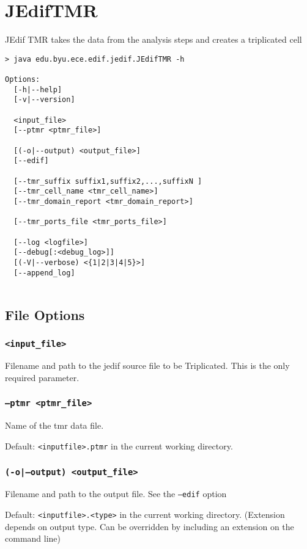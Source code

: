 
\section{JEdifTMR}
JEdif TMR takes the data from the analysis steps and creates a 
triplicated cell

\begin{verbatim}
> java edu.byu.ece.edif.jedif.JEdifTMR -h

Options:
  [-h|--help]
  [-v|--version]

  <input_file>
  [--ptmr <ptmr_file>]

  [(-o|--output) <output_file>]
  [--edif]

  [--tmr_suffix suffix1,suffix2,...,suffixN ]
  [--tmr_cell_name <tmr_cell_name>]
  [--tmr_domain_report <tmr_domain_report>]

  [--tmr_ports_file <tmr_ports_file>]

  [--log <logfile>]
  [--debug[:<debug_log>]]
  [(-V|--verbose) <{1|2|3|4|5}>]
  [--append_log]


\end{verbatim}

\subsection{File Options}

\subsubsection{\texttt{<input\_file>}}
Filename and path to the jedif source file to be
Triplicated. This is the only required parameter.

\subsubsection{\texttt{--ptmr <ptmr\_file>}}
Name of the tmr data file. 

Default: \texttt{<inputfile>.ptmr} in the current working directory.

\subsubsection{\texttt{(-o|--output) <output\_file>}}
Filename and path to the output file. See the \texttt{--edif}
option

Default: \texttt{<inputfile>.<type>} in the current working directory.
(Extension depends on output type. Can be overridden by including
an extension on the command line)

